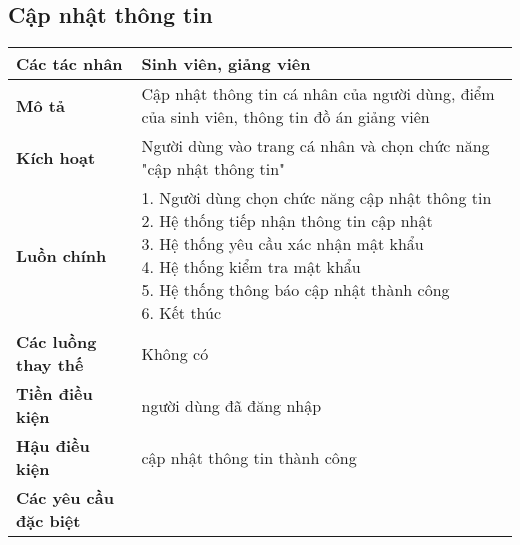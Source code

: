 	\subsection*{Cập nhật thông tin}
	\begin{tabular}{|l|p{}|}
		\hline
		\textbf{Các tác nhân}         & Sinh viên, giảng viên                                                              \\
		\hline
		\textbf{Mô tả}                & Cập nhật thông tin cá nhân của người dùng, điểm của sinh viên, thông tin đồ án giảng viên \\
		\hline
		\textbf{Kích hoạt}            & Người dùng vào trang cá nhân và chọn chức năng "cập nhật thông tin"                       \\
		\hline
		\textbf{Luồn chính}           & \makecell[l]{1. Người dùng chọn chức năng cập nhật thông tin                              \\ 2. Hệ thống tiếp nhận thông tin cập nhật \\ 3. Hệ thống yêu cầu xác nhận mật khẩu \\ 4. Hệ thống kiểm tra mật khẩu \\ 5. Hệ thống thông báo cập nhật thành công \\ 6. Kết thúc} \\
		\hline
		\textbf{Các luồng thay thế}   & Không có                                                                                  \\
		\hline
		\textbf{Tiền điều kiện}       & người dùng đã đăng nhập                                                                   \\
		\hline
		\textbf{Hậu điều kiện}        & cập nhật thông tin thành công                                                             \\
		\hline
		\textbf{Các yêu cầu đặc biệt} &                                                                                           \\
		\hline
	\end{tabular}

